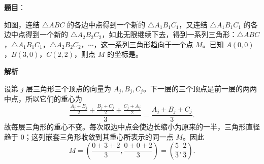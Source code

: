 \begin{answer}

\textbf{题目}：

如图，连结 $\triangle ABC$ 的各边中点得到一个新的 $\triangle A_1B_1C_1$，又连结 $\triangle A_1B_1C_1$ 的各边中点得到一个新的 $\triangle A_2B_2C_2$，如此无限继续下去，得到一系列三角形：$\triangle ABC$，$\triangle A_1B_1C_1$，$\triangle A_2B_2C_2$，$\cdots$，这一系列三角形趋向于一个点 $M$。已知 $A(0,0)$，$B(3,0)$，$C(2,2)$，则点 $M$ 的坐标是\gkblank{}。
\nopagebreak[4]
\begin{center}\end{center}
\nopagebreak[4]
\textbf{解析}

设第 $j$ 层三角形三个顶点的向量为 $A_j,B_j,C_j$。下一层的三个顶点是前一层的两两中点，所以它们的重心为
\nopagebreak[4]
\[
\frac{\frac{A_j+B_j}{2}+\frac{B_j+C_j}{2}+\frac{C_j+A_j}{2}}{3}
=\frac{A_j+B_j+C_j}{3}.
\]
故每层三角形的重心不变。每次取边中点会使边长缩小为原来的一半，三角形直径趋于 $0$；这列嵌套三角形收敛到其重心所表示的同一点 $M$。因此
\nopagebreak[4]
\[
M=\left(\frac{0+3+2}{3},\frac{0+0+2}{3}\right)
=\left(\frac53,\frac23\right).
\]
\nopagebreak[4]
\begin{center}\end{center}
\nopagebreak[4]

\end{answer}
